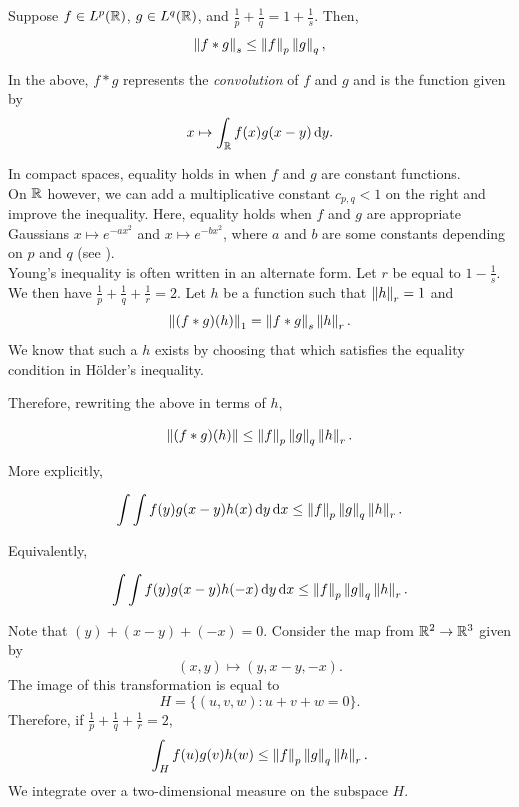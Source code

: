\begin{theorem}
\label{young's convolution inequality}
Suppose $f\in L^p(\mathbb{R})$, $g\in L^q(\mathbb{R})$, and $\frac{1}{p} + \frac{1}{q} = 1 + \frac{1}{s}$. Then,
\begin{equation}
\label{eqn young's convolution inequality}
    \left\lVert f * g\right\rVert_s \leq \left\lVert f\right\rVert_p \left\lVert g\right\rVert_q,
\end{equation}
\end{theorem}

In the above, $f * g$ represents the \textit{convolution} of $f$ and $g$ and is the function given by
\[ x \mapsto \int_{\mathbb{R}} f(x) g(x-y) \operatorname{d}\!{y}. \]

In compact spaces, equality holds in  when $f$ and $g$ are constant functions.\\
On $\mathbb{R}$ however, we can add a multiplicative constant $c_{p,q}<1$ on the right and improve the inequality. Here, equality holds when $f$ and $g$ are appropriate Gaussians $x\mapsto e^{-a x^2}$ and $x\mapsto e^{-b x^2}$, where $a$ and $b$ are some constants depending on $p$ and $q$ (see \cite{BRASCAMP1976151}). \\
Young's inequality is often written in an alternate form. Let $r$ be equal to $1-\frac{1}{s}$. We then have $\frac{1}{p} + \frac{1}{q} + \frac{1}{r} = 2$. Let $h$ be a function such that $\left\lVert h\right\rVert_r=1$ and
\[ \left\lVert(f*g)(h)\right\rVert_1 = \left\lVert f*g\right\rVert_s \left\lVert h\right\rVert_r. \]
We know that such a $h$ exists by choosing that which satisfies the equality condition in H\"older's inequality.

Therefore, rewriting the above in terms of $h$,

\[ \left\lVert(f*g)(h)\right\rVert \leq \left\lVert f\right\rVert_p \left\lVert g\right\rVert_q \left\lVert h\right\rVert_r. \]

More explicitly,

\[ \int \int f(y) g(x-y) h(x) \operatorname{d}\!{y} \operatorname{d}\!{x} \leq \left\lVert f\right\rVert_p \left\lVert g\right\rVert_q \left\lVert h\right\rVert_r. \]

Equivalently,

\[ \int \int f(y) g(x-y) h(-x) \operatorname{d}\!{y} \operatorname{d}\!{x} \leq \left\lVert f\right\rVert_p \left\lVert g\right\rVert_q \left\lVert h\right\rVert_r. \]

Note that $(y) + (x-y) + (-x) = 0$. Consider the map from $\mathbb{R}^2\to \mathbb{R}^3$ given by
\[ (x,y) \mapsto (y,x-y,-x). \]
The image of this transformation is equal to
\[ H = \{(u,v,w):u+v+w=0\}. \]
Therefore, if $\frac{1}{p} + \frac{1}{q} + \frac{1}{r} = 2$,
\[ \int_H f(u)g(v)h(w) \leq \left\lVert f\right\rVert_p \left\lVert g\right\rVert_q \left\lVert h\right\rVert_r. \]
We integrate over a two-dimensional measure on the subspace $H$.\\

